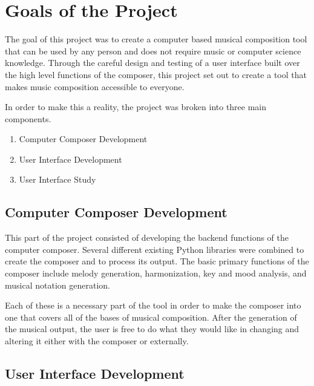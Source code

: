 \section{Goals of the Project}
\label{sec:goals}

The goal of this project was to create a computer based musical composition tool that can be used by any person and does not require music or computer science knowledge.  Through the careful design and testing of a user interface built over the high level functions of the composer, this project set out to create a tool that makes music composition accessible to everyone.

\vspace{\baselineskip}

In order to make this a reality, the project was broken into three main components.

\begin{enumerate}
	\item Computer Composer Development
	\item User Interface Development
	\item User Interface Study
\end{enumerate}

\subsection{Computer Composer Development}
\label{subsec:ccdev}

This part of the project consisted of developing the backend functions of the computer composer.  Several different existing Python libraries were combined to create the composer and to process its output.  The basic primary functions of the composer include melody generation, harmonization, key and mood analysis, and musical notation generation.

\vspace{\baselineskip}

Each of these is a necessary part of the tool in order to make the composer into one that covers all of the bases of musical composition.  After the generation of the musical output, the user is free to do what they would like in changing and altering it either with the composer or externally.

\subsection{User Interface Development}
\label{subsec:uidev}

